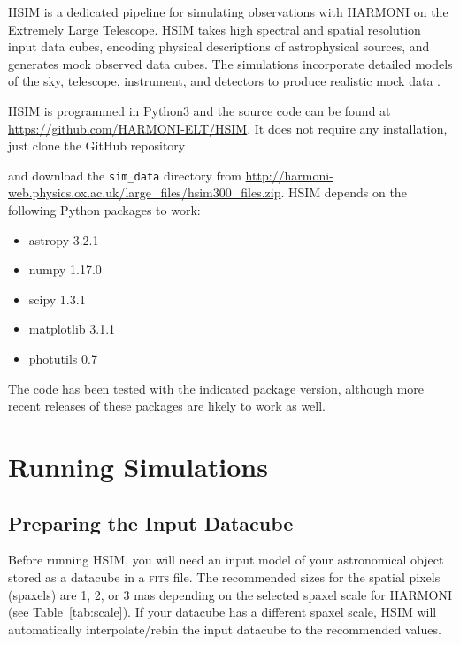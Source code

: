 \documentclass[12pt]{report}
\begin{document}
HSIM is a dedicated pipeline for simulating observations with HARMONI on the Extremely Large Telescope. HSIM takes high spectral and spatial resolution input data cubes, encoding physical descriptions of astrophysical sources, and generates mock observed data cubes. The simulations incorporate detailed models of the sky, telescope, instrument, and detectors to produce realistic mock data \citep{Zieleniewski2015}.

HSIM is programmed in Python3 and the source code can be found at \url{https://github.com/HARMONI-ELT/HSIM}. It does not require any installation, just clone the GitHub repository 


and download the \texttt{sim\_data} directory from \url{http://harmoni-web.physics.ox.ac.uk/large_files/hsim300_files.zip}. HSIM depends on the following Python packages to work:

\begin{itemize}
\setlength\itemsep{-0.5ex}
\item astropy 3.2.1
\item numpy 1.17.0
\item scipy 1.3.1
\item matplotlib 3.1.1
\item photutils 0.7
\end{itemize}

The code has been tested with the indicated package version, although more recent releases of these packages are likely to work as well.


\section{Running Simulations}

\subsection{Preparing the Input Datacube}

Before running HSIM, you will need an input model of your astronomical object stored as a datacube in a \textsc{fits} file. The recommended sizes for the spatial pixels (spaxels) are 1, 2, or 3 mas depending on the selected spaxel scale for HARMONI (see Table~\ref{tab:scale}). If your datacube has a different spaxel scale, HSIM will automatically interpolate\slash rebin the input datacube to the recommended values.
\end{document}

